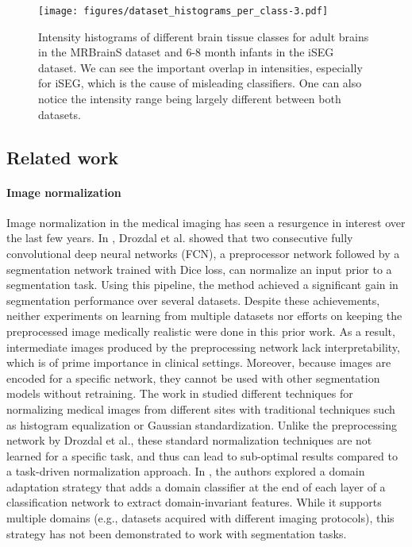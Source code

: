 \documentclass[preprint,12pt]{elsarticle}
\begin{document}
\begin{figure*}
    \begin{center}
        \texttt{[image: figures/dataset\_histograms\_per\_class-3.pdf]}
    \end{center}
    \caption{Intensity histograms of different brain tissue classes for adult brains in the MRBrainS dataset and 6-8 month infants in the iSEG dataset. We can see the important overlap in intensities, especially for iSEG, which is the cause of misleading classifiers. One can also notice the intensity range being largely different between both datasets.}
    \label{figure1}
\end{figure*}

\subsection{Related work}

\paragraph{Image normalization}
Image normalization in the medical imaging has seen a resurgence in interest over the last few years. In \cite{Drozdzal}, Drozdal et al. showed that two consecutive fully convolutional deep neural networks (FCN), a preprocessor network followed by a segmentation network trained with Dice loss, can normalize an input prior to a segmentation task. Using this pipeline, the method achieved a significant gain in segmentation performance over several datasets.
Despite these achievements, neither experiments on learning from multiple datasets nor efforts on keeping the preprocessed image medically realistic were done in this prior work. As a result, intermediate images produced by the preprocessing network lack interpretability, which is of prime importance in clinical settings. Moreover, because images are encoded for a specific network, they cannot be used with other segmentation models without retraining. The work in \cite{Onofrey2019} studied different techniques for normalizing medical images from different sites with traditional techniques such as histogram equalization or Gaussian standardization. Unlike the preprocessing network by Drozdal et al., these standard normalization techniques are not learned for a specific task, and thus can lead to sub-optimal results compared to a task-driven normalization approach. In \cite{Ciga2019}, the authors explored a domain adaptation strategy that adds a domain classifier at the end of each layer of a classification network to extract domain-invariant features. While it supports multiple domains (e.g., datasets acquired with different imaging protocols), this strategy has not been demonstrated to work with segmentation tasks. %
\end{document}

